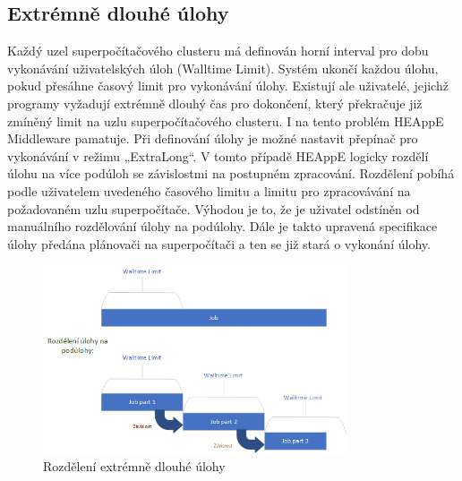 \subsection{Extrémně dlouhé úlohy}
Každý uzel superpočítačového clusteru má definován horní interval pro dobu vykonávání uživatelských úloh (Walltime Limit). Systém ukončí každou úlohu, pokud přesáhne časový limit pro vykonávání úlohy. Existují ale uživatelé, jejichž programy vyžadují extrémně dlouhý čas pro dokončení, který překračuje již zmíněný limit na uzlu superpočítačového clusteru. I na tento problém HEAppE Middleware pamatuje. Při definování úlohy je možné nastavit přepínač pro vykonávání v režimu „ExtraLong“. V tomto případě HEAppE logicky rozdělí úlohu na více podúloh se závislostmi na postupném zpracování. Rozdělení pobíhá podle uživatelem uvedeného časového limitu a limitu pro zpracovávání na požadovaném uzlu superpočítače. Výhodou je to, že je uživatel odstíněn od manuálního rozdělování úlohy na podúlohy. Dále je takto upravená specifikace úlohy předána plánovači na superpočítači a ten se již stará o vykonání úlohy.

\hfill \break
\begin{figure}[h]
	\centering
	\includegraphics[width=0.8\textwidth]{Figures/job-decompose.png}
	\caption{Rozdělení extrémně dlouhé úlohy }
	\label{fig:WritingThesis}
\end{figure}